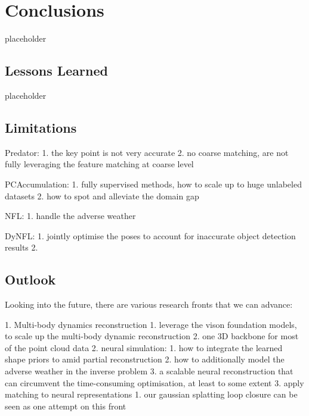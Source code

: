 \chapter{Conclusions}
\label{chap:conclusion}
placeholder

\section{Lessons Learned}
placeholder
\section{Limitations}
Predator:
1. the key point is not very accurate 
2. no coarse matching, are not fully leveraging the feature matching at coarse level

PCAccumulation:
1. fully supervised methods, how to scale up to huge unlabeled datasets 
2. how to spot and alleviate the domain gap

NFL:
1. handle the adverse weather

DyNFL:
1. jointly optimise the poses to account for inaccurate object detection results 
2. 


\section{Outlook}
Looking into the future, there are various research fronts that we can advance: 

1. Multi-body dynamics reconstruction
    1. leverage the vison foundation models, to scale up the multi-body dynamic reconstruction
    2. one 3D backbone for most of the point cloud data 
2. neural simulation:
    1. how to integrate the learned shape priors to amid partial reconstruction 
    2. how to additionally model the adverse weather in the inverse problem 
    3. a scalable neural reconstruction that can circumvent the time-consuming optimisation, at least to some extent
3. apply matching to neural representations
    1. our gaussian splatting loop closure can be seen as one attempt on this front 

